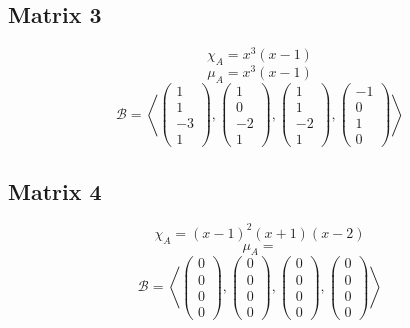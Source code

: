 \documentclass[10pt,a4paper]{article}
\begin{document}
\subsection*{Matrix 3}

\begin{equation}
\chi_{A} = x^{3}(x - 1)
\end{equation}
\begin{equation}
\mu_{A} = x^{3}(x - 1)
\end{equation}
\begin{equation}
\mathcal{B} = \left \langle
\begin{pmatrix}
1\\1\\-3\\1
\end{pmatrix},
\begin{pmatrix}
1\\0\\-2\\1
\end{pmatrix},
\begin{pmatrix}
1\\1\\-2\\1
\end{pmatrix},
\begin{pmatrix}
-1\\0\\1\\0
\end{pmatrix}
\right \rangle
\end{equation}

\subsection*{Matrix 4}

\begin{equation}
\chi_{A} = (x - 1)^{2}(x + 1)(x - 2)
\end{equation}
\begin{equation}
\mu_{A} = 
\end{equation}
\begin{equation}
\mathcal{B} = \left \langle
\begin{pmatrix}
0\\0\\0\\0
\end{pmatrix},
\begin{pmatrix}
0\\0\\0\\0
\end{pmatrix},
\begin{pmatrix}
0\\0\\0\\0
\end{pmatrix},
\begin{pmatrix}
0\\0\\0\\0
\end{pmatrix}
\right \rangle
\end{equation}
\end{document}
